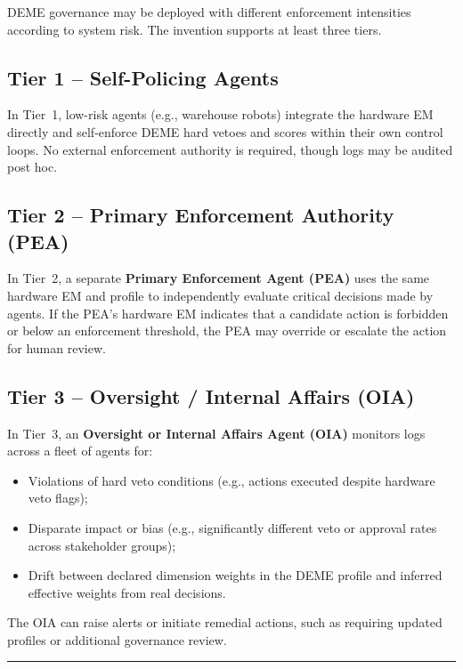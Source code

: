 \documentclass[11pt]{article}
\begin{document}
DEME governance may be deployed with different enforcement intensities according to system risk. The invention supports at least three tiers.

\subsection{Tier 1 -- Self-Policing Agents}

In Tier~1, low-risk agents (e.g., warehouse robots) integrate the hardware EM directly and self-enforce DEME hard vetoes and scores within their own control loops. No external enforcement authority is required, though logs may be audited post hoc.

\subsection{Tier 2 -- Primary Enforcement Authority (PEA)}

In Tier~2, a separate \textbf{Primary Enforcement Agent (PEA)} uses the same hardware EM and profile to independently evaluate critical decisions made by agents. If the PEA's hardware EM indicates that a candidate action is forbidden or below an enforcement threshold, the PEA may override or escalate the action for human review.

\subsection{Tier 3 -- Oversight / Internal Affairs (OIA)}

In Tier~3, an \textbf{Oversight or Internal Affairs Agent (OIA)} monitors logs across a fleet of agents for:

\begin{itemize}
  \item Violations of hard veto conditions (e.g., actions executed despite hardware veto flags);
  \item Disparate impact or bias (e.g., significantly different veto or approval rates across stakeholder groups);
  \item Drift between declared dimension weights in the DEME profile and inferred effective weights from real decisions.
\end{itemize}

The OIA can raise alerts or initiate remedial actions, such as requiring updated profiles or additional governance review.

\hrule
\vspace{1em}
\end{document}
